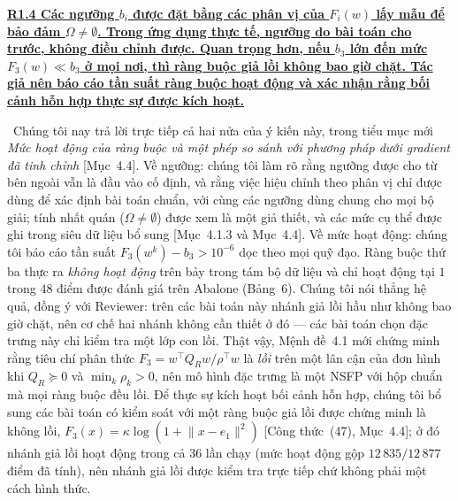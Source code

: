 \documentclass[11pt]{article}
\newcommand{\response}[1]{\smallskip\noindent{\color{blue!60!black}\textbf{Trả lời.}}\ #1\par\medskip}
\newcommand{\loc}[1]{\textcolor{blue!50!black}{[#1]}}
\newenvironment{point}[1]{\medskip\noindent\textbf{\uline{#1}}\par}{\par}
\begin{document}
\begin{point}{R1.4 Các ngưỡng $b_i$ được đặt bằng các phân vị của $F_i(w)$ lấy mẫu để
bảo đảm $\Omega\neq\emptyset$. Trong ứng dụng thực tế, ngưỡng do bài toán cho trước,
không điều chỉnh được. Quan trọng hơn, nếu $b_3$ lớn đến mức $F_3(w)\ll b_3$ ở mọi nơi, thì
ràng buộc giả lồi không bao giờ chặt. Tác giả nên báo cáo tần suất ràng buộc hoạt động
và xác nhận rằng bối cảnh hỗn hợp thực sự được kích hoạt.}
\response{Chúng tôi nay trả lời trực tiếp cả hai nửa của ý kiến này, trong tiểu mục mới
\emph{Mức hoạt động của ràng buộc và một phép so sánh với phương pháp dưới gradient đã tinh chỉnh} \loc{Mục~4.4}. Về
ngưỡng: chúng tôi làm rõ rằng ngưỡng được cho từ bên ngoài vẫn là đầu vào cố định, và rằng
việc hiệu chỉnh theo phân vị chỉ được dùng để xác định bài toán chuẩn, với cùng
các ngưỡng dùng chung cho mọi bộ giải; tính nhất quán ($\Omega\neq\emptyset$) được xem là một
giả thiết, và các mức cụ thể được ghi trong siêu dữ liệu bổ sung
\loc{Mục~4.1.3 và Mục~4.4}. Về mức hoạt động: chúng tôi báo cáo tần suất
$F_3(w^k)-b_3>10^{-6}$ dọc theo mọi quỹ đạo. Ràng buộc thứ ba thực ra
\emph{không hoạt động} trên bảy trong tám bộ dữ liệu và chỉ hoạt động tại $1$ trong $48$ điểm được
đánh giá trên Abalone (Bảng~6). Chúng tôi nói thẳng hệ quả, đồng ý với
Reviewer: trên các bài toán này nhánh giả lồi hầu như không bao giờ chặt, nên
cơ chế hai nhánh không cần thiết ở đó --- các bài toán chọn đặc trưng này chỉ kiểm tra một
lớp con lồi. Thật vậy, Mệnh đề~4.1 mới chứng minh rằng
tiêu chí phân thức $F_3=w^{\top}Q_Rw/\rho^{\top}w$ là \emph{lồi} trên một lân cận
của đơn hình khi $Q_R\succeq0$ và $\min_k\rho_k>0$, nên mô hình đặc trưng là
một NSFP với hộp chuẩn mà mọi ràng buộc đều lồi. Để thực sự kích hoạt bối cảnh hỗn hợp, chúng tôi bổ sung các bài toán
có kiểm soát với một ràng buộc giả lồi được chứng minh là không lồi,
$F_3(x)=\kappa\log(1+\lVert x-e_1\rVert^2)$ \loc{Công thức~(47), Mục~4.4}; ở đó
nhánh giả lồi hoạt động trong cả $36$ lần chạy (mức hoạt động gộp $12\,835/12\,877$ điểm
đã tính), nên nhánh giả lồi được kiểm tra trực tiếp chứ không phải một cách hình thức.}
\end{point}
\end{document}
